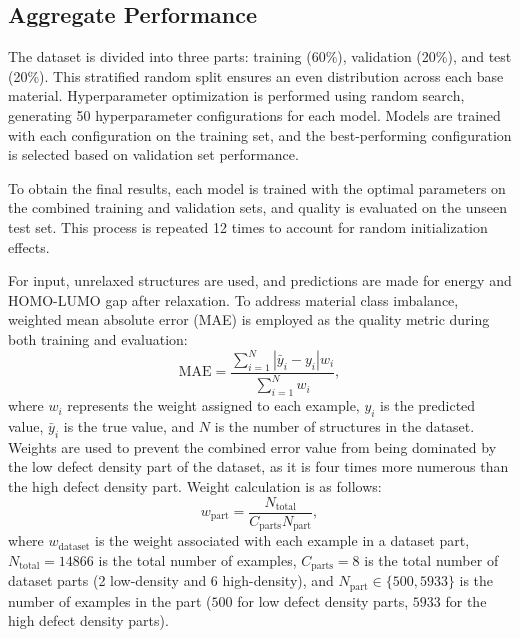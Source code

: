 \subsection{Aggregate Performance}
    \label{subsec:evaluation:aggregate}
    The dataset is divided into three parts: training (60\%), validation (20\%), and test (20\%). This stratified random split ensures an even distribution across each base material. Hyperparameter optimization is performed using random search, generating 50 hyperparameter configurations for each model. Models are trained with each configuration on the training set, and the best-performing configuration is selected based on validation set performance.
    
    To obtain the final results, each model is trained with the optimal parameters on the combined training and validation sets, and quality is evaluated on the unseen test set. This process is repeated 12 times to account for random initialization effects.
    
    For input, unrelaxed structures are used, and predictions are made for energy and HOMO-LUMO gap after relaxation. To address material class imbalance, weighted mean absolute error (MAE) is employed as the quality metric during both training and evaluation:
    \begin{equation}
        \label{eq:mae}
        \text{MAE} = \frac{\sum_{i=1}^N |\bar{y}_i - y_i|w_i}{\sum_{i=1}^N w_i},
    \end{equation}
    where $w_i$ represents the weight assigned to each example, $y_i$ is the predicted value, $\bar{y}_i$ is the true value, and $N$ is the number of structures in the dataset. Weights are used to prevent the combined error value from being dominated by the low defect density part of the dataset, as it is four times more numerous than the high defect density part. Weight calculation is as follows:
    \begin{equation}
        w_\text{part} = \frac{N_\text{total}}{C_\text{parts}N_\text{part}},
        \label{eq:weight}
    \end{equation}
    where $w_\text{dataset}$ is the weight associated with each example in a dataset part, $N_\text{total}=14866$ is the total number of examples, $C_\text{parts}=8$ is the total number of dataset parts (2 low-density and 6 high-density), and $N_\text{part} \in \{500, 5933\}$ is the number of examples in the part ($500$ for low defect density parts, $5933$ for the high defect density parts).
    
